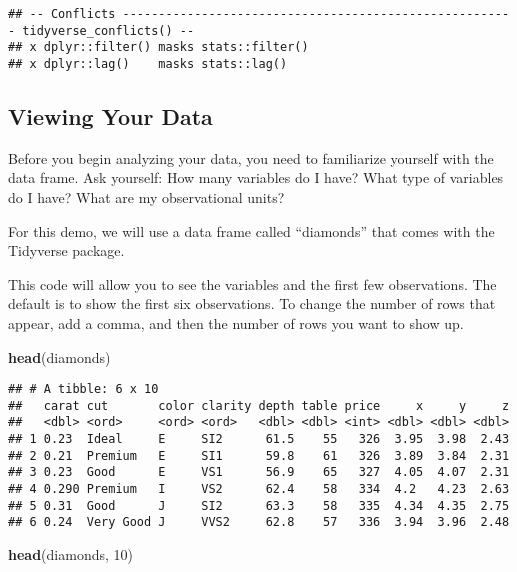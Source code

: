 \documentclass[]{article}
\newenvironment{Shaded}{\begin{snugshade}}{\end{snugshade}}
\newcommand{\KeywordTok}[1]{\textcolor[rgb]{0.13,0.29,0.53}{\textbf{#1}}}
\newcommand{\DecValTok}[1]{\textcolor[rgb]{0.00,0.00,0.81}{#1}}
\newcommand{\NormalTok}[1]{#1}
\begin{document}
\begin{verbatim}
## -- Conflicts ------------------------------------------------------- tidyverse_conflicts() --
## x dplyr::filter() masks stats::filter()
## x dplyr::lag()    masks stats::lag()
\end{verbatim}

\subsection{Viewing Your Data}\label{viewing-your-data}

Before you begin analyzing your data, you need to familiarize yourself
with the data frame. Ask yourself: How many variables do I have? What
type of variables do I have? What are my observational units?

For this demo, we will use a data frame called ``diamonds'' that comes
with the Tidyverse package.

This code will allow you to see the variables and the first few
observations. The default is to show the first six observations. To
change the number of rows that appear, add a comma, and then the number
of rows you want to show up.

\begin{Shaded}
\begin{Highlighting}[]
\KeywordTok{head}\NormalTok{(diamonds)}
\end{Highlighting}
\end{Shaded}

\begin{verbatim}
## # A tibble: 6 x 10
##   carat cut       color clarity depth table price     x     y     z
##   <dbl> <ord>     <ord> <ord>   <dbl> <dbl> <int> <dbl> <dbl> <dbl>
## 1 0.23  Ideal     E     SI2      61.5    55   326  3.95  3.98  2.43
## 2 0.21  Premium   E     SI1      59.8    61   326  3.89  3.84  2.31
## 3 0.23  Good      E     VS1      56.9    65   327  4.05  4.07  2.31
## 4 0.290 Premium   I     VS2      62.4    58   334  4.2   4.23  2.63
## 5 0.31  Good      J     SI2      63.3    58   335  4.34  4.35  2.75
## 6 0.24  Very Good J     VVS2     62.8    57   336  3.94  3.96  2.48
\end{verbatim}

\begin{Shaded}
\begin{Highlighting}[]
\KeywordTok{head}\NormalTok{(diamonds, }\DecValTok{10}\NormalTok{)}
\end{Highlighting}
\end{Shaded}
\end{document}
